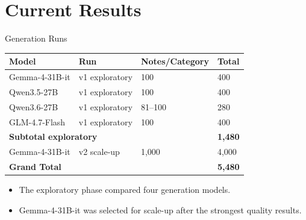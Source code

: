 \documentclass[aspectratio=169]{beamer}
\begin{document}
\section{Current Results}

\begin{frame}{Generation Runs}
    \small
    \begin{table}
        \centering
        \begin{tabular}{llll}
            \toprule
            \textbf{Model} & \textbf{Run} & \textbf{Notes/Category} & \textbf{Total} \\
            \midrule
            Gemma-4-31B-it & v1 exploratory & 100 & 400 \\
            Qwen3.5-27B & v1 exploratory & 100 & 400 \\
            Qwen3.6-27B & v1 exploratory & 81--100 & 280 \\
            GLM-4.7-Flash & v1 exploratory & 100 & 400 \\
            \midrule
            \multicolumn{3}{l}{\textbf{Subtotal exploratory}} & \textbf{1,480} \\
            \midrule
            Gemma-4-31B-it & v2 scale-up & 1,000 & 4,000 \\
            \midrule
            \textbf{Grand Total} & & & \textbf{5,480} \\
            \bottomrule
        \end{tabular}
    \end{table}

    \begin{itemize}
        \item The exploratory phase compared four generation models.
        \item Gemma-4-31B-it was selected for scale-up after the strongest quality results.
    \end{itemize}
\end{frame}
\end{document}
